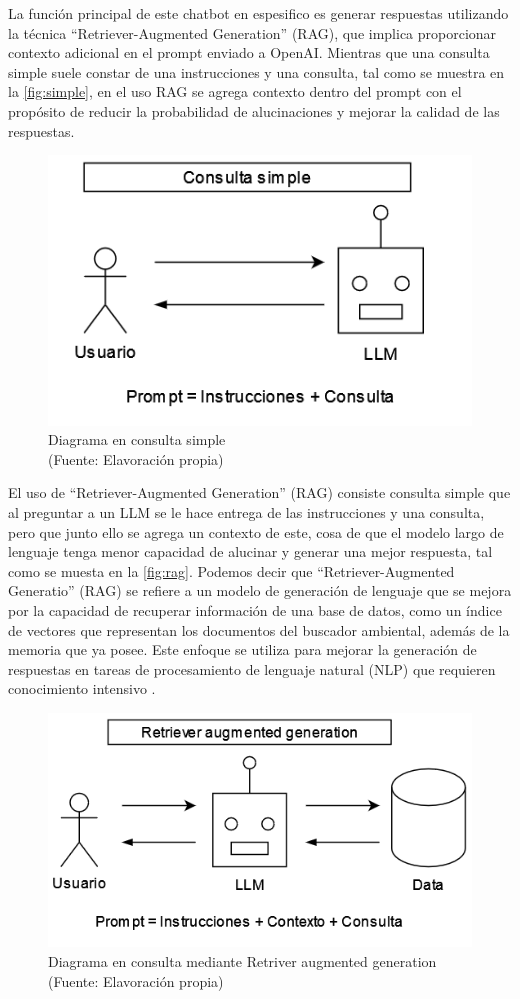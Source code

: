 \newpage


La función principal de este chatbot en espesifico es generar respuestas utilizando la técnica ``Retriever-Augmented Generation'' (RAG), 
que implica proporcionar contexto adicional en el prompt enviado a OpenAI. Mientras que una consulta simple suele 
constar de una instrucciones y una consulta, tal como se muestra en la \autoref{fig:simple}, en el uso RAG se agrega contexto dentro del prompt con el propósito de reducir la 
probabilidad de alucinaciones y mejorar la calidad de las respuestas. 

\begin{figure}[ht!]
    \centering
    \includegraphics[width=.4\textwidth]{figures/huemul6.png}
    \caption[Diagrama en consulta simple]{Diagrama en consulta simple\\
    {\scriptsize (Fuente: Elavoración propia)}}
    \label{fig:simple}
\end{figure}


El uso de ``Retriever-Augmented Generation'' (RAG)
consiste consulta simple que al preguntar a un LLM se le hace entrega de las instrucciones y una consulta, pero que junto ello se agrega un contexto 
de este, cosa de que el modelo largo de lenguaje tenga menor capacidad de alucinar y generar una mejor respuesta, tal como se muesta en la \autoref{fig:rag}. Podemos decir
que ``Retriever-Augmented Generatio'' (RAG) se refiere a un modelo de generación de lenguaje que se mejora por la capacidad 
de recuperar información de una base de datos, como un índice de vectores que representan los documentos del buscador ambiental, 
además de la memoria que ya posee. Este enfoque se utiliza para mejorar la generación de respuestas en tareas de procesamiento 
de lenguaje natural (NLP) que requieren conocimiento intensivo \cite{raq}.

\begin{figure}[ht!]
    \centering
    \includegraphics[width=.4\textwidth]{figures/huemul5.png}
    \caption[Diagrama en consulta mediante Retriver augmented generation]{Diagrama en consulta mediante Retriver augmented generation\\
    {\scriptsize (Fuente: Elavoración propia)}}
    \label{fig:rag}
\end{figure}

